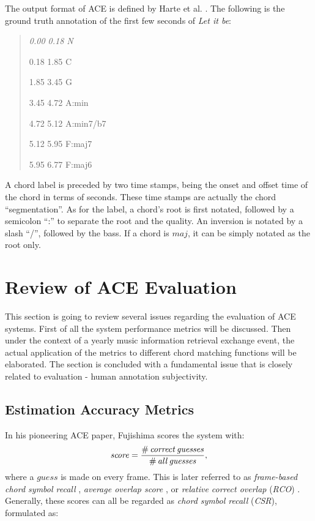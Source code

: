 The output format of ACE is defined by Harte et al. \cite{harte2005symbolic}. The following is the ground truth annotation of the first few seconds of {\it Let it be}:
\begin{quote}\footnotesize \it
0.00 0.18 N

0.18 1.85 C

1.85 3.45 G

3.45 4.72 A:min

4.72 5.12 A:min7/b7

5.12 5.95 F:maj7

5.95 6.77 F:maj6
\end{quote}
A chord label is preceded by two time stamps, being the onset and offset time of the chord in terms of seconds. These time stamps are actually the chord ``segmentation''. As for the label, a chord's root is first notated, followed by a semicolon ``:'' to separate the root and the quality. An inversion is notated by a slash ``/'', followed by the bass. If a chord is $maj$, it can be simply notated as the root only.

\section{Review of ACE Evaluation} \label{sec:2-eval}
This section is going to review several issues regarding the evaluation of ACE systems. First of all the system performance metrics will be discussed. Then under the context of a yearly music information retrieval exchange event, the actual application of the metrics to different chord matching functions will be elaborated. The section is concluded with a fundamental issue that is closely related to evaluation - human annotation subjectivity.

\subsection{Estimation Accuracy Metrics} \label{subsec:2-metrics}
In his pioneering ACE paper, Fujishima \cite{fujishima1999realtime} scores the system with:
\begin{equation}\label{eq:2-fujiscore}
\mathit{score = {\#\,correct\,guesses\over\#\,all\,guesses},}
\end{equation}
where a $guess$ is made on every frame. This is later referred to as {\it frame-based chord symbol recall} \cite{harte2010towards}, {\it average overlap score} \cite{oudre2010template}, or {\it relative correct overlap} (\textit{RCO}) \cite{mauch2010automatic}. Generally, these scores can all be regarded as {\it chord symbol recall} (\textit{CSR}), formulated as:

